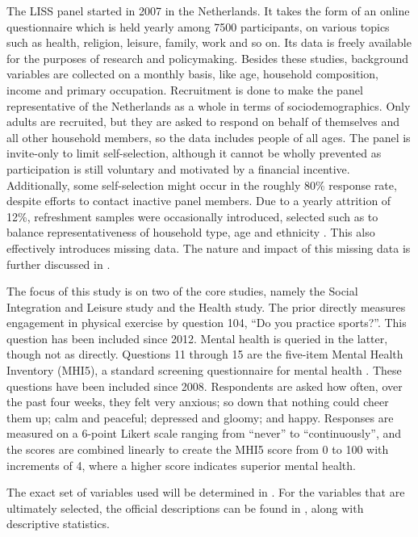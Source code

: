 The LISS panel \cite{scherpenzeel2010liss} started in 2007 in the Netherlands. It takes the form of an online questionnaire
which is held yearly among 7500 participants, on various topics such as health, religion, leisure, family, work and so on.
Its data is freely available for the purposes of research and policymaking.
Besides these studies, background variables are collected on a monthly basis, like age, household composition,
income and primary occupation.
Recruitment is done to make the panel representative of the Netherlands as a whole in terms of sociodemographics.
Only adults are recruited, but they are asked to respond on behalf of themselves and all other household members,
so the data includes people of all ages.
The panel is invite-only to limit self-selection, although it cannot be wholly prevented as
participation is still voluntary and motivated by a financial incentive. Additionally, some self-selection might occur
in the roughly 80\% response rate, despite efforts to contact inactive panel members. Due to a yearly attrition of 12\%,
refreshment samples were occasionally introduced, selected such as to balance representativeness of household type,
age and ethnicity \cite{lissdata_methodology}. This also effectively introduces missing data.
The nature and impact of this missing data is further discussed in .

The focus of this study is on two of the core studies, namely the Social Integration and Leisure study and the Health study.
The prior directly measures engagement in physical exercise by question 104, ``Do you practice sports?''. This question
has been included since 2012.
Mental health is queried in the latter, though not as directly. Questions 11 through 15 are the five-item Mental Health Inventory
(MHI5), a standard screening questionnaire for mental health \cite{berwick1991performance}. These questions have been included
since 2008.
Respondents are asked how often, over the past four weeks,
they felt very anxious; so down that nothing could cheer them up; calm and peaceful; depressed and gloomy; and happy.
Responses are measured on a 6-point Likert scale ranging from ``never'' to ``continuously'', and the scores are combined
linearly to create the MHI5 score from 0 to 100 with increments of 4, where a higher score indicates superior mental health.

The exact set of variables used will be determined in .
For the variables that are ultimately selected, the official descriptions can be found in ,
along with descriptive statistics.

